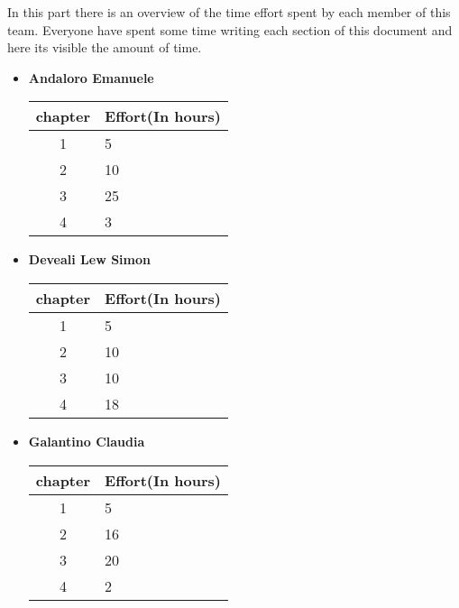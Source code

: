 In this part there is an overview of the time effort spent by each member of this team. Everyone have spent some time writing each section of this document and here its visible the amount of time.\\
\begin{itemize}
    

\item  \textbf{Andaloro Emanuele}
\begin{table}[h!]
    \centering
    \begin{tabular}{|c|p{10cm}|}
        \hline
        \textbf{chapter} & \textbf{Effort(In hours)} \\
        \hline
        1 & 5 \\
        \hline
        2 & 10\\
        \hline
        3 & 25\\
        \hline
        4 & 3\\
        \hline            
    \end{tabular}
    \end{table}

\item  \textbf{Deveali Lew Simon}
\begin{table}[h!]
    \centering
    \begin{tabular}{|c|p{10cm}|}
        \hline
        \textbf{chapter} & \textbf{Effort(In hours)} \\
        \hline
        1 & 5 \\
        \hline
        2 & 10\\
        \hline
        3 & 10\\
        \hline
        4 & 18\\
        \hline            
    \end{tabular}
    \end{table}

\item  \textbf{Galantino Claudia}
\begin{table}[h!]
    \centering
    \begin{tabular}{|c|p{10cm}|}
        \hline
        \textbf{chapter} & \textbf{Effort(In hours)} \\
        \hline
        1 & 5 \\
        \hline
        2 & 16\\
        \hline
        3 & 20\\
        \hline
        4 & 2\\
        \hline            
    \end{tabular}
    \end{table}    

\end{itemize}